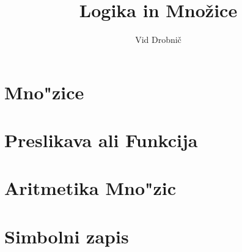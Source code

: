 \documentclass[a4paper, 12pt]{article}
\title{Logika in Množice}
\author{Vid Drobnič}
\date{}
\begin{document}
	\maketitle
	\thispagestyle{empty}
	\pagebreak
	\setcounter{page}{1}
	
	\tableofcontents
	\pagebreak
	
	\section{Mno"zice}
	
	
	\section{Preslikava ali Funkcija}
	
	
	\section{Aritmetika Mno"zic}
	
	
	\section{Simbolni zapis}
	
\end{document}
